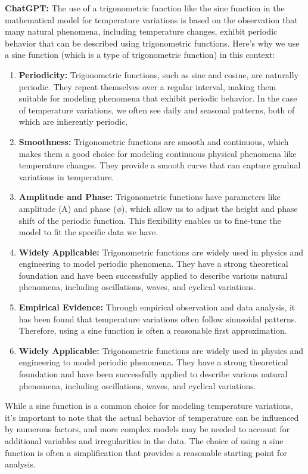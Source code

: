 \documentclass[11pt]{article} %
\begin{document}
\begin{mdframed}[
        backgroundcolor=white,  %
        linecolor=black,        %
        leftmargin=5pt,         %
        rightmargin=5pt,        %
        linewidth=2pt           %
    ]
    \textbf{ChatGPT: } The use of a trigonometric function like the sine function in the mathematical model for temperature variations is based on the observation that many natural phenomena, including temperature changes, exhibit periodic behavior that can be described using trigonometric functions. Here's why we use a sine function (which is a type of trigonometric function) in this context:


    \begin{enumerate}
        \item \textbf{Periodicity: }Trigonometric functions, such as sine and cosine, are naturally periodic. They repeat themselves over a regular interval, making them suitable for modeling phenomena that exhibit periodic behavior. In the case of temperature variations, we often see daily and seasonal patterns, both of which are inherently periodic.
        \item \textbf{Smoothness: }Trigonometric functions are smooth and continuous, which makes them a good choice for modeling continuous physical phenomena like temperature changes. They provide a smooth curve that can capture gradual variations in temperature.
        \item \textbf{Amplitude and Phase: }Trigonometric functions have parameters like amplitude (A) and phase (\(\phi\)), which allow us to adjust the height and phase shift of the periodic function. This flexibility enables us to fine-tune the model to fit the specific data we have.
        \item \textbf{Widely Applicable: }Trigonometric functions are widely used in physics and engineering to model periodic phenomena. They have a strong theoretical foundation and have been successfully applied to describe various natural phenomena, including oscillations, waves, and cyclical variations.
        \item \textbf{Empirical Evidence: }Through empirical observation and data analysis, it has been found that temperature variations often follow sinusoidal patterns. Therefore, using a sine function is often a reasonable first approximation.
        \item \textbf{Widely Applicable: }Trigonometric functions are widely used in physics and engineering to model periodic phenomena. They have a strong theoretical foundation and have been successfully applied to describe various natural phenomena, including oscillations, waves, and cyclical variations.
    \end{enumerate}
    While a sine function is a common choice for modeling temperature variations, it's important to note that the actual behavior of temperature can be influenced by numerous factors, and more complex models may be needed to account for additional variables and irregularities in the data. The choice of using a sine function is often a simplification that provides a reasonable starting point for analysis.
\end{mdframed}
\end{document}
